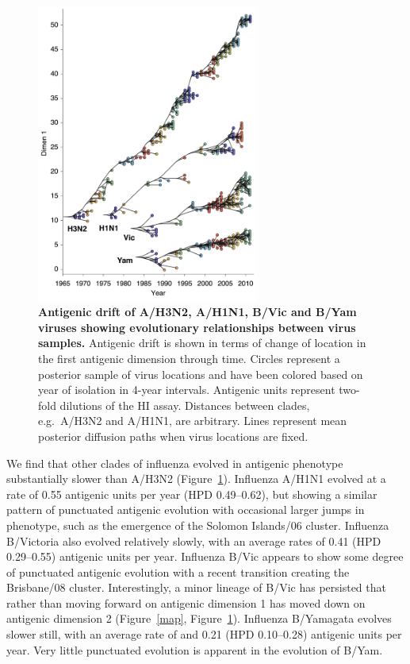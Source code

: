 \documentclass[11pt,oneside,letterpaper]{article}
\begin{document}
\begin{figure}[h]
	\centering		
	\includegraphics[width=0.65\textwidth]{figures/drift}
	\caption{\textbf{Antigenic drift of A/H3N2, A/H1N1, B/Vic and B/Yam viruses showing evolutionary relationships between virus samples.} 
	Antigenic drift is shown in terms of change of location in the first antigenic dimension through time.
	Circles represent a posterior sample of virus locations and have been colored based on year of isolation in 4-year intervals.
	Antigenic units represent two-fold dilutions of the HI assay.
	Distances between clades, e.g.\ A/H3N2 and A/H1N1, are arbitrary.
	Lines represent mean posterior diffusion paths when virus locations are fixed.} 
	\label{drift} 
\end{figure}

We find that other clades of influenza evolved in antigenic phenotype substantially slower than A/H3N2 (Figure~\ref{drift}).
Influenza A/H1N1 evolved at a rate of 0.55 antigenic units per year (HPD 0.49--0.62), but showing a similar pattern of punctuated antigenic evolution with occasional larger jumps in phenotype, such as the emergence of the Solomon Islands/06 cluster.  
Influenza B/Victoria also evolved relatively slowly, with an average rates of 0.41 (HPD 0.29--0.55) antigenic units per year.
Influenza B/Vic appears to show some degree of punctuated antigenic evolution with a recent transition creating the Brisbane/08 cluster.
Interestingly, a minor lineage of B/Vic has persisted that rather than moving forward on antigenic dimension 1 has moved down on antigenic dimension 2 (Figure~\ref{map}, Figure~\ref{drift}).
Influenza B/Yamagata evolves slower still, with an average rate of and 0.21 (HPD 0.10--0.28) antigenic units per year.
Very little punctuated evolution is apparent in the evolution of B/Yam.
\end{document}
